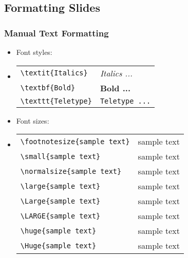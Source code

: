 \subsection{Formatting Slides}

\begin{slide}
  \frametitle{Manual Text Formatting}
  \begin{itemize}
    \item Font styles:
    \item[]
      \begin{tabular}{l | l}
        \footnotesize{\texttt{\textbackslash textit\{Italics\} }} & \textit{Italics ...}  \\
        \footnotesize{\texttt{\textbackslash textbf\{Bold\}    }} & \textbf{Bold ...}     \\
        \footnotesize{\texttt{\textbackslash texttt\{Teletype\}}} & \texttt{Teletype ...} \\
      \end{tabular}
    \item Font sizes:
    \item[]
      \begin{tabular}{l | c}
        \footnotesize{\texttt{\textbackslash footnotesize\{sample text\}}} & \footnotesize{sample text} \\
        \footnotesize{\texttt{\textbackslash small\{sample text\}       }} & \small{sample text}        \\
        \footnotesize{\texttt{\textbackslash normalsize\{sample text\}  }} & \normalsize{sample text}   \\
        \footnotesize{\texttt{\textbackslash large\{sample text\}       }} & \large{sample text}        \\
        \footnotesize{\texttt{\textbackslash Large\{sample text\}       }} & \Large{sample text}        \\
        \footnotesize{\texttt{\textbackslash LARGE\{sample text\}       }} & \LARGE{sample text}        \\
        \footnotesize{\texttt{\textbackslash huge\{sample text\}        }} & \huge{sample text}         \\
        \footnotesize{\texttt{\textbackslash Huge\{sample text\}        }} & \Huge{sample text}         \\
      \end{tabular}
  \end{itemize}
\end{slide}

